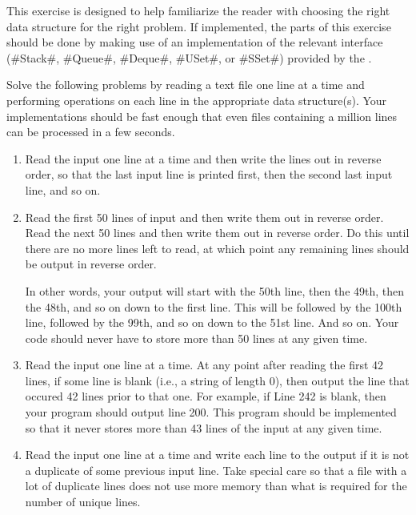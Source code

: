 \begin{exc}
  This exercise is designed to help familiarize the reader with choosing the right data structure for the right problem.  If implemented, the parts of this exercise should be done by making use of an implementation of the relevant interface (#Stack#, #Queue#, #Deque#, #USet#, or #SSet#) provided by the .

  Solve the following problems by reading a text file one line at a time and performing operations on each line in the appropriate data structure(s).  Your implementations should be fast enough that even files containing a million lines can be processed in a few seconds.
  \begin{enumerate}
    \item Read the input one line at a time and then write the lines out in reverse order, so that the last input line is printed first, then the second last input line, and so on.

    \item  Read the first 50 lines of input and then write them out in reverse order. Read the next 50 lines and then write them out in reverse order. Do this until there are no more lines left to read, at which point any remaining lines should be output in reverse order.

      In other words, your output will start with the 50th line, then the 49th, then the 48th, and so on down to the first line. This will be followed by the 100th line, followed by the 99th, and so on down to the 51st line. And so on.  Your code should never have to store more than 50 lines at any given time.

    \item Read the input one line at a time.  At any point after reading the first 42 lines, if some line is blank (i.e., a string of length 0), then output the line that occured 42 lines prior to that one. For example, if Line 242 is blank, then your program should output line 200. This program should be implemented so that it never stores more than 43 lines of the input at any given time.

    \item Read the input one line at a time and write each line to the output if it is not a duplicate of some previous input line. Take special care so that a file with a lot of duplicate lines does not use more memory than what is required for the number of unique lines.


\end{enumerate}
\end{exc}

